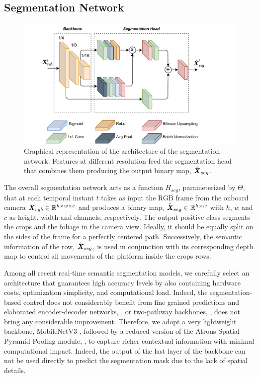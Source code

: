 \documentclass[journal]{IEEEtran}
\begin{document}
\subsection{Segmentation Network}
\begin{figure}[!b]
\centering
\includegraphics[scale=0.63]{segnet_head.pdf}
\caption{Graphical representation of the architecture of the segmentation network. Features at different resolution feed the segmentation head that combines them producing the output binary map, $\hat{\textbf{\textit{X}}}_{seg}$.}
\label{fig:segnet_head}
\end{figure}
The overall segmentation network acts as a function $H_{seg}$, parameterized by $\Theta$, that at each temporal instant $t$ takes as input the RGB frame from the onboard camera $\textbf{\textit{X}}_{rgb} \in  \mathbb{R}^{h\times w\times c}$ and produces a binary map, $\hat{\textbf{\textit{X}}}_{seg} \in  \mathbb{R}^{h\times w}$ with $h$, $w$ and $c$ as height, width and channels, respectively. The output positive class segments the crops and the foliage in the camera view. Ideally, it should be equally split on the sides of the frame for a perfectly centered path. Successively, the semantic information of the row, $\hat{\textbf{\textit{X}}}_{seg}$, is used in conjunction with its corresponding depth map to control all movements of the platform inside the crops rows.

Among all recent real-time semantic segmentation models, we carefully select an architecture that guarantees high accuracy levels by also containing hardware costs, optimization simplicity, and computational load. Indeed, the segmentation-based control does not considerably benefit from fine grained predictions and elaborated encoder-decoder networks, \cite{hu2020real}, or two-pathway backbones, \cite{yu2020bisenet}, does not bring any considerable improvement. Therefore, we adopt a very lightweight backbone,  MobileNetV3 \cite{howard2019searching}, followed by a reduced
version of the Atrous Spatial Pyramid Pooling module, \cite{chen2017rethinking}, to capture richer contextual information with minimal computational impact. Indeed, the output of the last layer of the backbone can not be used directly to predict the segmentation mask due to the lack of spatial details.
\end{document}

